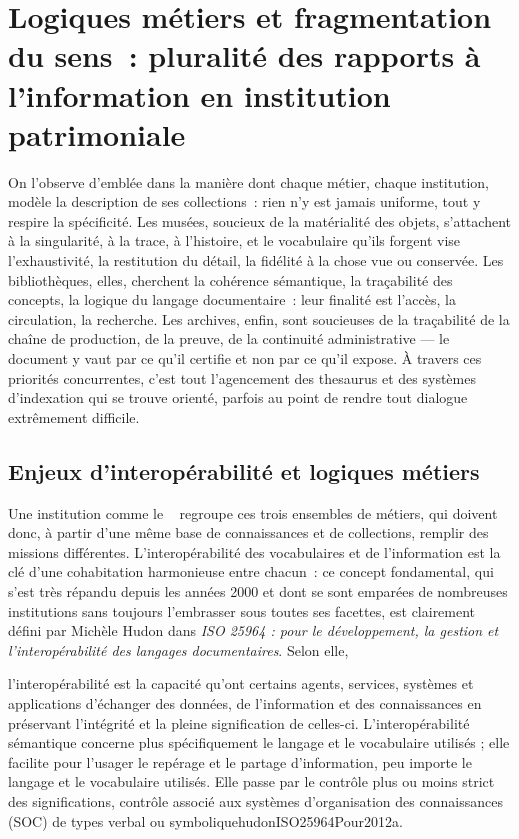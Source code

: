 \section{\label{II-B-2}Logiques métiers et fragmentation du sens~: pluralité des rapports à l’information en institution patrimoniale}

On l’observe d’emblée dans la manière dont chaque métier, chaque institution, modèle la description de ses collections~: rien n’y est jamais uniforme, tout y respire la spécificité. Les musées, soucieux de la matérialité des objets, s’attachent à la singularité, à la trace, à l’histoire, et le vocabulaire qu’ils forgent vise l’exhaustivité, la restitution du détail, la fidélité à la chose vue ou conservée. Les bibliothèques, elles, cherchent la cohérence sémantique, la traçabilité des concepts, la logique du langage documentaire~: leur finalité est l’accès, la circulation, la recherche. Les archives, enfin, sont soucieuses de la traçabilité de la chaîne de production, de la preuve, de la continuité administrative — le document y vaut par ce qu’il certifie et non par ce qu’il expose. À travers ces priorités concurrentes, c’est tout l’agencement des \gls{thesaurus} et des systèmes d’indexation qui se trouve orienté, parfois au point de rendre tout dialogue extrêmement difficile.

\subsection{Enjeux d’interopérabilité et logiques métiers}

Une institution comme le \mae~ regroupe ces trois ensembles de métiers, qui doivent donc, à partir d'une même base de connaissances et de collections, remplir des missions différentes. L’interopérabilité des vocabulaires et de l'information est la clé d'une cohabitation harmonieuse entre chacun~: ce concept fondamental, qui s'est très répandu depuis les années 2000 et dont se sont emparées de nombreuses institutions sans toujours l'embrasser sous toutes ses facettes, est clairement défini par Michèle Hudon dans \textit{ISO 25964 : pour le développement, la gestion et l’interopérabilité des langages documentaires}. Selon elle,
\begin{myquote}
	{l’interopérabilité est la capacité qu’ont certains agents, services, systèmes et applications d’échanger des données, de l’information et des connaissances en préservant l’intégrité et la pleine signification de celles-ci. L’interopérabilité sémantique concerne plus spécifiquement le langage et le vocabulaire utilisés \textelp{} ; elle facilite pour l’usager le repérage et le partage d’information, peu importe le langage et le vocabulaire utilisés. \textelp{} Elle passe par le contrôle plus ou moins strict des significations, contrôle associé aux systèmes d’organisation des connaissances (SOC) de types verbal ou symbolique}{hudonISO25964Pour2012a}.
\end{myquote}

